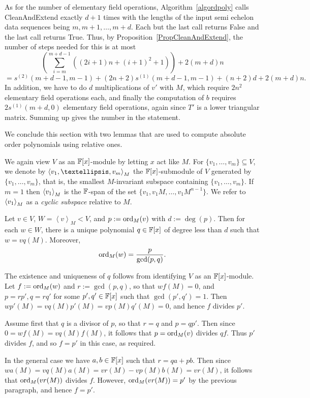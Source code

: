 As for the number of elementary field operations, Algorithm~\ref{algordpoly}
calls {\sc CleanAndExtend} exactly $d+1$ times with the lengths 
of the input semi echelon data sequences being $m,m+1, \ldots, m+d$. Each but the last call
returns {\sc False} and the last call returns {\sc True}. Thus, by
Proposition~\ref{PropCleanAndExtend}, the number of steps needed for this is at most
\[
\left(\sum_{i=m}^{m+d-1} ((2i+1)n+(i+1)^2+1)\right)  +  2(m+d)n  \]
\[
   = s^{(2)}(m+d-1,m-1) + (2n+2)s^{(1)}(m+d-1,m-1) + (n+2)d +2(m+d)n.
\]
In addition, we have to do $d$ multiplications of $v'$ with $M$, which require
$2n^2$ elementary field operations each, and finally the computation of $b$
requires $2s^{(1)}(m+d,0)$ elementary field operations, again since 
$T'$ is a lower triangular matrix. Summing up gives the number in 
the statement. 
\proofend

\smallskip
We conclude this section with two lemmas that are used to compute
absolute order polynomials using relative ones. 

We again view $V$ as
an $\mathbb{F}[x]$-module by letting $x$ act like $M$. For $\{v_1,\dots,v_m\}
\subseteq V$, we denote by $\la v_1,\dots,v_m\ra_M$ the $\mathbb{F}[x]$-submodule 
of $V$ generated by $\{v_1,\dots,v_m\}$, that is, the smallest $M$-invariant
subspace containing  $\{v_1,\dots,v_m\}$. If $m=1$ then $\left< v_1\right>_M$ 
is the $\mathbb{F}$-span of the set $\{v_1,v_1M,\dots, v_1M^{n-1}\}$. We refer to 
$\left< v_1\right>_M$ as a \emph{cyclic subspace} 
relative to $M$.

\begin{Lemm}
\label{ordpolcyclic}
Let $v\in V$, $W = \left< v \right>_M < V$, and
$p := \mathrm{ord}_M(v)$ with $d := \deg(p)$. 
Then for each $w \in W$, there is a unique polynomial
$q \in \mathbb{F}[x]$ of degree less than $d$ such that $w = vq(M)$.
Moreover,
\[ \mathrm{ord}_M(w) = \frac{p}{\gcd(p,q)}. \]
\end{Lemm}
\proofbeg
The existence and uniqueness of $q$ follows from identifying $V$ as an 
$\mathbb{F}[x]$-module. Let $f := \mathrm{ord}_M(w)$ and $r := \gcd(p,q)$, so that $wf(M)=0$, and 
$p=rp', q=rq'$ for some $p',q'\in\mathbb{F}[x]$ such that $\gcd(p',q')=1$. 
Then  $w p'(M) = v q(M) p'(M) = v p(M) 
q'(M) = 0$, and hence $f$  divides $p'$.

Assume first that $q$ is a divisor of $p$, so that $r = q$ and $p=qp'$. 
Then since $0=wf(M)=vq(M)f(M)$, it follows
that $p = \mathrm{ord}_M(v)$ divides $qf$. Thus $p'$ divides $f$, and so
$f=p'$ in this case, as required.

In the general case we have $a,b \in \mathbb{F}[x]$ such that 
$r = qa+pb$. Then since $wa(M) = vq(M)a(M) = vr(M) - vp(M)b(M) = vr(M)$,
it follows that $\mathrm{ord}_M(vr(M))$ divides $f$. However, $\mathrm{ord}_M(vr(M)) = p'$ 
by the previous paragraph, and hence $f = p'$.
\proofend

